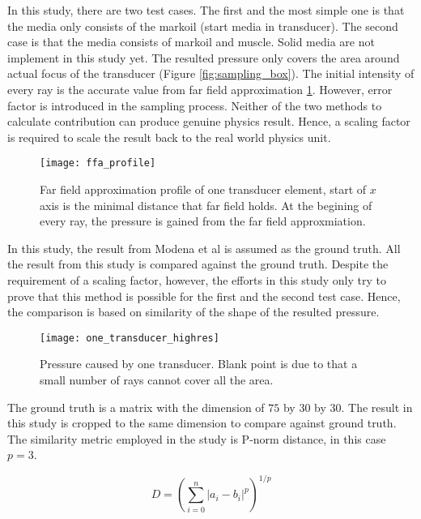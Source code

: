 
In this study, there are two test cases. The first and the most simple one is that the media only consists of the markoil (start media in transducer). The second case is that the media consists of markoil and muscle. Solid media are not implement in this study yet. The resulted pressure only covers the area around actual focus of the transducer (Figure \ref{fig:sampling_box}). The initial intensity of every ray is the accurate value from far field approximation \ref{fig:ffa_profile}. However, error factor is introduced in the sampling process. Neither of the two methods to calculate contribution can produce genuine physics result. Hence, a scaling factor is required to scale the result back to the real world physics unit.

\begin{figure}[h]
    \centering
    \texttt{[image: ffa\_profile]}
    \caption{Far field approximation profile of one transducer element, start of $x$ axis is the minimal distance that far field holds. At the begining of every ray, the pressure is gained from the far field approxmiation.}
    \label{fig:ffa_profile}
\end{figure}

In this study, the result from Modena et al \cite{Modena_2018} is assumed as the ground truth. All the result from this study is compared against the ground truth. Despite the requirement of a scaling factor, however, the efforts in this study only try to prove that this method is possible for the first and the second test case. Hence, the comparison is based on similarity of the shape of the resulted pressure.

\begin{figure}[h]
    \centering
    \texttt{[image: one\_transducer\_highres]}
    \caption{Pressure caused by one transducer. Blank point is due to that a small number of rays cannot cover all the area.}
    \label{fig:one_transducer_intensity}
\end{figure}

The ground truth is a matrix with the dimension of $75$ by $30$ by $30$. The result in this study is cropped to the same dimension to compare against ground truth. The similarity metric employed in the study is P-norm distance, in this case $p=3$.

\begin{equation} \label{eq:pnorm}
    D=\left(\sum_{i=0}^{n}|a_i - b_i|^p\right)^{1/p}
\end{equation}

